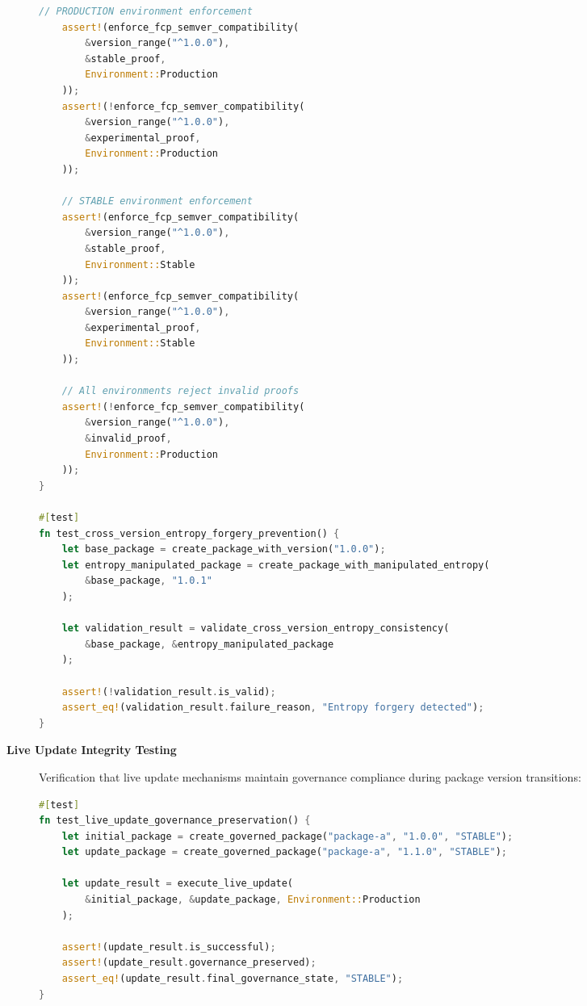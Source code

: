 \begin{description}
\begin{lstlisting}[style=riftlang, language=rust, caption=Semver Compatibility Unit Tests]
    // PRODUCTION environment enforcement
    assert!(enforce_fcp_semver_compatibility(
        &version_range("^1.0.0"),
        &stable_proof,
        Environment::Production
    ));
    assert!(!enforce_fcp_semver_compatibility(
        &version_range("^1.0.0"),
        &experimental_proof,
        Environment::Production
    ));
    
    // STABLE environment enforcement
    assert!(enforce_fcp_semver_compatibility(
        &version_range("^1.0.0"),
        &stable_proof,
        Environment::Stable
    ));
    assert!(enforce_fcp_semver_compatibility(
        &version_range("^1.0.0"),
        &experimental_proof,
        Environment::Stable
    ));
    
    // All environments reject invalid proofs
    assert!(!enforce_fcp_semver_compatibility(
        &version_range("^1.0.0"),
        &invalid_proof,
        Environment::Production
    ));
}

#[test]
fn test_cross_version_entropy_forgery_prevention() {
    let base_package = create_package_with_version("1.0.0");
    let entropy_manipulated_package = create_package_with_manipulated_entropy(
        &base_package, "1.0.1"
    );
    
    let validation_result = validate_cross_version_entropy_consistency(
        &base_package, &entropy_manipulated_package
    );
    
    assert!(!validation_result.is_valid);
    assert_eq!(validation_result.failure_reason, "Entropy forgery detected");
}
\end{lstlisting}

\item[\textbf{Live Update Integrity Testing}] Verification that live update mechanisms maintain governance compliance during package version transitions:

\begin{lstlisting}[style=riftlang, language=rust, caption=Live Update Integrity Tests]
#[test]
fn test_live_update_governance_preservation() {
    let initial_package = create_governed_package("package-a", "1.0.0", "STABLE");
    let update_package = create_governed_package("package-a", "1.1.0", "STABLE");
    
    let update_result = execute_live_update(
        &initial_package, &update_package, Environment::Production
    );
    
    assert!(update_result.is_successful);
    assert!(update_result.governance_preserved);
    assert_eq!(update_result.final_governance_state, "STABLE");
}


\end{lstlisting}
\end{description}
